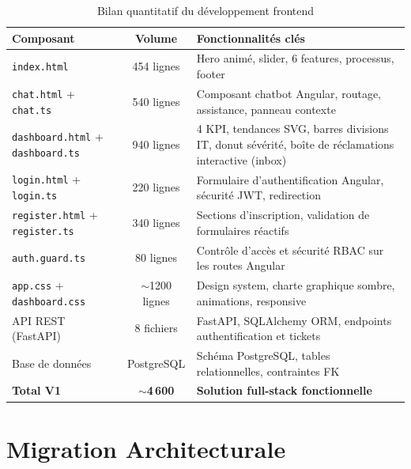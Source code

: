 \documentclass[12pt,a4paper]{report}
\begin{document}
\begin{table}[H]
\centering
\caption{Bilan quantitatif du développement frontend}
\begin{tabularx}{\textwidth}{|l|c|X|}
\hline
\textbf{Composant} & \textbf{Volume} & \textbf{Fonctionnalités clés} \\
\hline
\texttt{index.html} & 454 lignes & Hero animé, slider, 6 features, processus, footer \\
\hline
\texttt{chat.html} + \texttt{chat.ts} & 540 lignes & Composant chatbot Angular, routage, assistance, panneau contexte \\
\hline
\texttt{dashboard.html} + \texttt{dashboard.ts} & 940 lignes & 4 KPI, tendances SVG, barres divisions IT, donut sévérité, boîte de réclamations interactive (inbox) \\
\hline
\texttt{login.html} + \texttt{login.ts} & 220 lignes & Formulaire d'authentification Angular, sécurité JWT, redirection \\
\hline
\texttt{register.html} + \texttt{register.ts} & 340 lignes & Sections d'inscription, validation de formulaires réactifs \\
\hline
\texttt{auth.guard.ts} & 80 lignes & Contrôle d'accès et sécurité RBAC sur les routes Angular \\
\hline
\texttt{app.css} + \texttt{dashboard.css} & $\sim$1200 lignes & Design system, charte graphique sombre, animations, responsive \\
\hline
API REST (FastAPI) & 8 fichiers & FastAPI, SQLAlchemy ORM, endpoints authentification et tickets \\
\hline
Base de données & PostgreSQL & Schéma PostgreSQL, tables relationnelles, contraintes FK \\
\hline
\textbf{Total V1} & \textbf{$\sim$4\,600} & \textbf{Solution full-stack fonctionnelle} \\
\hline
\end{tabularx}
\end{table}

\section{Migration Architecturale}
\end{document}
